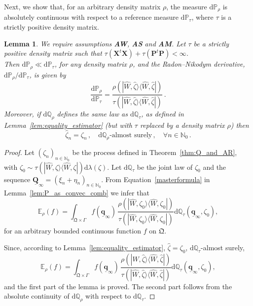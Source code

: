 \documentclass[11pt]{article}
\newtheorem{lemma}[theorem]{Lemma}
\newcommand{\ket}[1]{|{#1}\rangle}
\newcommand{\bra}[1]{\langle{#1}|}
\renewcommand{\d}{{\mathrm d}}
\begin{document}
Next, we show that, for an arbitrary density matrix $\rho$, the measure $\d\mathbb P_\rho$ is absolutely continuous with respect to a reference measure 
$\d\mathbb P_\tau$, where $\tau$ is a strictly positive density matrix.
\begin{lemma}\label{lem:AC}
	We require assumptions {\bf{AW}}, {\bf{AS}} and {\bf{AM}}. Let $\tau$ be a strictly positive density matrix such that $\tau(\mathbf X^t\mathbf X)+\tau(\mathbf P^t\mathbf P)<\infty$.\\
	Then $\d\mathbb P_\rho\ll \d\mathbb P_\tau$, for any density matrix $\rho$, and the Radon--Nikodym derivative, 
	$\d\mathbb P_\rho/\d\mathbb P_\tau$, is given by
	$$\frac{\d\mathbb P_\rho}{\d\mathbb P_\tau}=\frac{\rho(\ket{\widehat W,\widehat \zeta}\bra{\widehat W,\widehat \zeta})}{\tau(\ket{\widehat W,\widehat \zeta}\bra{\widehat W,\widehat \zeta})}\,.$$
	Moreover, if $\d\mathbb Q_\rho$ defines the same law as $\d\mathbb Q_\tau$, as defined in Lemma~\ref{lem:equality_estimator} (but with $\tau$ replaced by a density matrix $\rho$) then
		$$\widehat \zeta_n=\zeta_n\,, \quad \d\mathbb Q_\rho\mbox{-almost surely}\,, \quad \forall n\in \mathbb N_0\,.$$
\end{lemma}

\begin{proof}
	Let $(\zeta_n)_{n\in\mathbb N_0}$ be the process defined in Theorem~\ref{thm:Q_and_AR}, with 
	$\zeta_0\sim \tau(\ket{\widehat W,\zeta}\bra{\widehat W,\zeta})\d\lambda(\zeta)$. Let $\d \mathbb Q_\tau$ be the joint law of $\zeta_0$ and the sequence $\underline{\mathbf Q}_\infty=(\xi_n+ \eta_n)_{n\in\mathbb N_0}$.
	From Equation~\eqref{masterformula} in Lemma~\ref{lem:P_as_convec_comb} we infer that 
$$\mathbb E_{\rho}(f)=\int_{\mathfrak Q \times \Gamma} f(\underline{\mathbf q}_{\infty})\, \frac{\rho(\ket{\widehat W,\zeta_0}\bra{\widehat W,\zeta_0})}{\tau(\ket{\widehat W,\zeta_0}\bra{\widehat W,\zeta_0})}\d\mathbb Q_{\tau}(\underline{\mathbf q}_{\infty}, \zeta_0),$$
for an arbitrary bounded continuous function $f$ on $\mathfrak Q$.

	Since, according to Lemma~\ref{lem:equality_estimator}, $\widehat \zeta=\zeta_0$, $\d\mathbb Q_\tau$-almost surely, 
	$$\mathbb E_{\rho}(f)=\int_{\mathfrak Q \times \Gamma} f(\underline{\mathbf q}_{\infty})\, \frac{\rho(\ket{\widehat W,\widehat{\zeta}}\bra{\widehat W,\widehat{\zeta}})}{\tau(\ket{\widehat W,\widehat{\zeta}}\bra{\widehat W,\widehat{\zeta}})}\d\mathbb Q_{\tau}(\underline{\mathbf q}_{\infty}, \zeta_0),$$
and the first part of the lemma is proved. The second part follows from the absolute continuity of $\d\mathbb Q_\rho$ with respect to $\d\mathbb Q_\tau$.
\end{proof}
\end{document}
